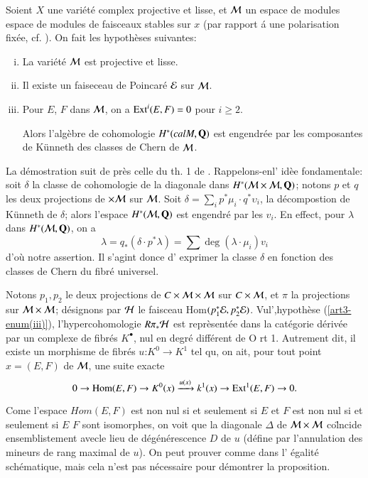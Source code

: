 \begin{prop*}
Soient $X$ une vari\'et\'e complex projective et lisse, et $\mathcal{M}$ un espace de modules espace de modules de faisceaux stables sur $x$ (par rapport \'a une polarisation fix\'ee, cf. \cite{art3-keyM}). On fait les hypoth\`eses suivantes:
\begin{enumerate}[(i)]
\item La vari\'et\'e $\mathcal{M}$ est projective et lisse.\label{art3-enum(i)}
\item Il existe un faiseceau de Poincar\'e $\mathcal{E}$ sur $\mathcal{M}$.\label{art3-enum(ii)}
\item Pour $E$, $F$ dans $\mathcal{M}$, on a $\operatorname{Ext}^{i}(E, F) =0$ pour $i\geq 2$.\label{art3-enum(iii)}

Alors l'alg\`ebre de cohomologie $H^{*}(calM, \mathbf{Q})$ est engendr\'ee par les composantes de K\"unneth des classes de Chern de $\mathcal{M}$.   
\end{enumerate}
\end{prop*}

La d\'emostration suit de pr\`es celle du th. 1 de \cite{art3-keyE-S}. Rappelons-enl' id\`ee fondamentale: soit $\delta$ la classe de cohomologie de la diagonale dans $H^{*}(\mathcal{M} \times \mathcal{M}, \mathbf{Q})$; notons $p$ et $q$ les deux projections de $\cal \times M$ sur $\mathcal{M}$. Soit $\delta = \sum\limits_{i}p^{*}\mu_{i} \cdot q^{*} \upsilon_{i}$, la d\'ecompostion de K\"unneth de $\delta$; alors l'espace $H^{*}(\mathcal{M}, \mathbf{Q})$ est engendr\'e par les $v_{i}$. En effect, pour $\lambda$ dans $H^{*}(\mathcal{M}, \mathbf{Q})$, on a
$$
\lambda = q_{*}(\delta \cdot p^{*}\lambda) = \sum\deg(\lambda \cdot \mu_{i})v_{i}
$$
d'o\`u notre assertion. Il s'agint donce d' exprimer la classe $\delta$ en fonction des classes de Chern du fibr\'e universel.

Notons $p_{1}, p_{2}$ le deux projections de $C\times \mathcal{M} \times \mathcal{M}$ sur $C \times \mathcal{M}$, et $\pi$ la projections sur  $\mathcal{M} \times \mathcal{M}$; d\'esignons par $\mathcal{H}$ le faisceau Hom$(p_{1}^{*}\mathcal{E}, p_{2}^{*}\mathcal{E})$. Vul',hypoth\`ese (\ref{art3-enum(iii)}), l'hypercohomologie $R\pi_{*}\mathcal{H}$ est repr\`esent\'ee dans la cat\'egorie d\'eriv\'ee par un complexe de fibr\'es $K^{\bullet}$, nul en degr\'e diff\'erent de O rt 1. Autrement dit, il existe un morphisme de fibr\'es $u$:$K^{0}\longrightarrow K^{1}$ tel qu, on ait, pour tout point $x=(E, F)$ de $\mathcal{M}$, une suite exacte
$$
0 \rightarrow \operatorname{Hom}(E, F) \rightarrow  K^{0}(x)\xrightarrow{u(x)}k^{1}(x)\rightarrow \operatorname{Ext}^{1}(E, F) \rightarrow 0.
$$

Come l'espace $Hom(E, F)$ est non nul si et seulement si $E$ et $F$ est non nul si et seulement si $E$ $F$ sont isomorphes, on voit que la diagonale $\Delta$ de $\mathcal{M} \times \mathcal{M}$ co\"lncide ensemblistement avecle lieu de d\'eg\'en\'erescence $D$ de $u$ (d\'efine par l'annulation des mineurs de rang maximal de $u$). On peut prouver comme dans \cite{art3-keyE-S} l' \'egalit\'e sch\'ematique, mais cela n'est pas n\'ecessaire pour d\'emontrer la proposition. 

